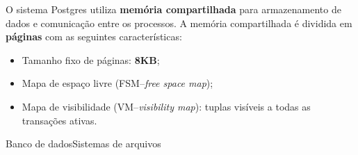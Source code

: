 \documentclass{beamer}
\def\onlytitleframe#1{\author{}\date{}\title{#1}\maketitle}
\begin{document}

\onlytitleframe{\insertlecture}

\begin{frame}{\insertlecture}

  O sistema Postgres utiliza {\bf memória compartilhada} para
  armazenamento de dados e comunicação entre os processos. A memória
  compartilhada é dividida em {\bf páginas} com as seguintes
  características:
  
  \begin{itemize}
  \item Tamanho fixo de páginas: {\bf 8KB};
  \item Mapa de espaço livre (FSM--{\it free space map\/});
  \item Mapa de visibilidade (VM--{\it visibility map\/}): tuplas visíveis a todas as transações ativas.
  \end{itemize}
  
\end{frame}


\begin{frame}{Banco de dados}{Sistemas de arquivos}
  

\end{frame}
\end{document}
